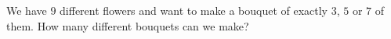We have $9$ different flowers and want to make a bouquet of exactly $3$, $5$ or $7$ of them. How many different bouquets can we make?
